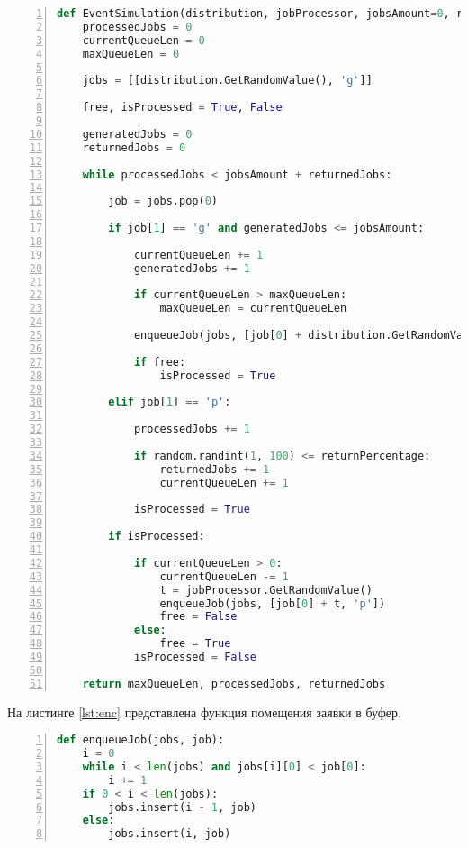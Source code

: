 \begin{lstlisting}[language=Python,
    frame= tb,
    numbers=left,
    numberstyle=\footnotesize,
    caption={Релаизация событийного метода},
    label={lst:ev}]
def EventSimulation(distribution, jobProcessor, jobsAmount=0, returnPercentage=0):
    processedJobs = 0
    currentQueueLen = 0
    maxQueueLen = 0

    jobs = [[distribution.GetRandomValue(), 'g']]

    free, isProcessed = True, False

    generatedJobs = 0
    returnedJobs = 0

    while processedJobs < jobsAmount + returnedJobs:

        job = jobs.pop(0)

        if job[1] == 'g' and generatedJobs <= jobsAmount:

            currentQueueLen += 1
            generatedJobs += 1

            if currentQueueLen > maxQueueLen:
                maxQueueLen = currentQueueLen

            enqueueJob(jobs, [job[0] + distribution.GetRandomValue(), 'g'])

            if free:
                isProcessed = True

        elif job[1] == 'p':

            processedJobs += 1

            if random.randint(1, 100) <= returnPercentage:
                returnedJobs += 1
                currentQueueLen += 1

            isProcessed = True

        if isProcessed:

            if currentQueueLen > 0:
                currentQueueLen -= 1
                t = jobProcessor.GetRandomValue()
                enqueueJob(jobs, [job[0] + t, 'p'])
                free = False
            else:
                free = True
            isProcessed = False

    return maxQueueLen, processedJobs, returnedJobs
\end{lstlisting}

На листинге \ref{lst:enc} представлена функция помещения заявки в буфер.
\begin{lstlisting}[language=Python,
    frame= tb,
    numbers=left,
    numberstyle=\footnotesize,
    caption={Вспомогательная функция помещения заявки в буфер},
    label={lst:enc}]
def enqueueJob(jobs, job):
    i = 0
    while i < len(jobs) and jobs[i][0] < job[0]:
        i += 1
    if 0 < i < len(jobs):
        jobs.insert(i - 1, job)
    else:
        jobs.insert(i, job)
\end{lstlisting}


